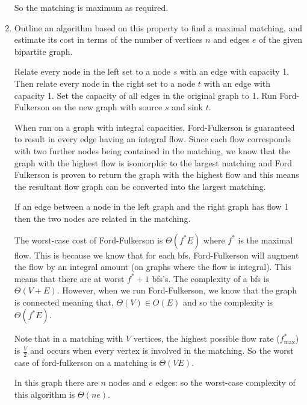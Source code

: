 \documentclass[10pt,\jkfside,a4paper]{article}
\begin{document}
\begin{enumerate}
So the matching is maximum as required.

\item Outline an algorithm based on this property to find a maximal matching, and estimate 
its cost in terms of the number of vertices $n$ and edges $e$ of the given bipartite graph.

Relate every node in the left set to a node $s$ with an edge with capacity 1. 
Then relate every node in the right set to a node $t$ with an edge with capacity 1.
Set the capacity of all edges in the original graph to 1.
Run Ford-Fulkerson on the new graph with source $s$ and sink $t$.

When run on a graph with integral capacities, Ford-Fulkerson is guaranteed to 
result in every edge having an integral flow. Since each flow corresponds with 
two further nodes being contained in the matching, we know that the graph with the 
highest flow is isomorphic to the largest matching and Ford Fulkerson is proven to 
return the graph with the highest flow and this means the 
resultant flow graph can be converted into the largest matching.

If an edge between a node in the left graph and the right graph has flow 1 then the 
two nodes are related in the matching.

The worst-case cost of Ford-Fulkerson is $\Theta(f^*E)$ where $f^*$ is the maximal flow. 
This is because we know that for each bfs, Ford-Fulkerson will augment the flow by an 
integral amount (on graphs where the flow is integral). This means that there are 
at worst $f^* + 1$ bfs's. The complexity of a bfs is $\Theta(V + E)$. However, when we 
run Ford-Fulkerson, we know that the graph is connected meaning that, $\Theta(V) \in O(E)$ 
and so the complexity is $\Theta(f^*E)$.

Note that in a matching with $V$ vertices, the highest possible flow rate ($f^*_{\max}$) is $\frac{V}{2}$ 
and occurs when every vertex is involved in the matching. So the worst case of ford-fulkerson 
on a matching is $\Theta(VE)$.

In this graph there are $n$ nodes and $e$ edges: so the worst-case complexity of this 
algorithm is $\Theta(ne)$.

\end{enumerate}
\end{document}
